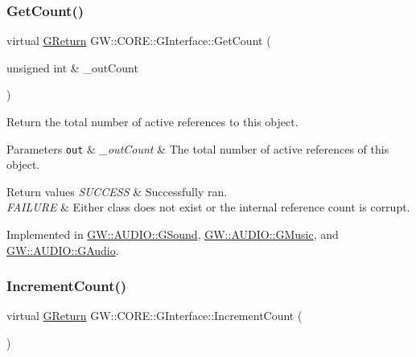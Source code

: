 \subsubsection{\texorpdfstring{Get\+Count()}{GetCount()}}
{\footnotesize\ttfamily virtual \mbox{\hyperlink{namespace_g_w_a67a839e3df7ea8a5c5686613a7a3de21}{G\+Return}} G\+W\+::\+C\+O\+R\+E\+::\+G\+Interface\+::\+Get\+Count (\begin{DoxyParamCaption}\item[{unsigned int \&}]{\+\_\+out\+Count }\end{DoxyParamCaption})\hspace{0.3cm}{\ttfamily [pure virtual]}}



Return the total number of active references to this object. 


\begin{DoxyParams}[1]{Parameters}
\mbox{\tt out}  & {\em \+\_\+out\+Count} & The total number of active references of this object.\\
\hline
\end{DoxyParams}

\begin{DoxyRetVals}{Return values}
{\em S\+U\+C\+C\+E\+SS} & Successfully ran. \\
\hline
{\em F\+A\+I\+L\+U\+RE} & Either class does not exist or the internal reference count is corrupt. \\
\hline
\end{DoxyRetVals}


Implemented in \mbox{\hyperlink{class_g_w_1_1_a_u_d_i_o_1_1_g_sound_afbac022010da2fc1a917ece2803a36a4}{G\+W\+::\+A\+U\+D\+I\+O\+::\+G\+Sound}}, \mbox{\hyperlink{class_g_w_1_1_a_u_d_i_o_1_1_g_music_ae41f54531b8325848215596fb2f821ac}{G\+W\+::\+A\+U\+D\+I\+O\+::\+G\+Music}}, and \mbox{\hyperlink{class_g_w_1_1_a_u_d_i_o_1_1_g_audio_a079dfab7b9db1536b10c9d2afa20c89c}{G\+W\+::\+A\+U\+D\+I\+O\+::\+G\+Audio}}.

\mbox{\label{class_g_w_1_1_c_o_r_e_1_1_g_interface_a2d710f20bb78e544e8309b5b75c21260}} 
\subsubsection{\texorpdfstring{Increment\+Count()}{IncrementCount()}}
{\footnotesize\ttfamily virtual \mbox{\hyperlink{namespace_g_w_a67a839e3df7ea8a5c5686613a7a3de21}{G\+Return}} G\+W\+::\+C\+O\+R\+E\+::\+G\+Interface\+::\+Increment\+Count (\begin{DoxyParamCaption}{ }\end{DoxyParamCaption})\hspace{0.3cm}{\ttfamily [pure virtual]}}




